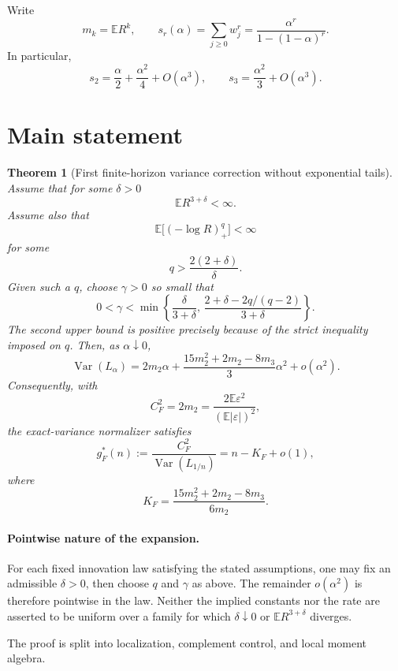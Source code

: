 \documentclass[11pt,a4paper]{article}
\newtheorem{theorem}{Theorem}
\newcommand{\E}{\mathbb E}
\newcommand{\Var}{\operatorname{Var}}
\begin{document}
Write
\[
m_k=\E R^k,
\qquad
s_r(\alpha)=\sum_{j\ge0}w_j^r
=\frac{\alpha^r}{1-(1-\alpha)^r}.
\]
In particular,
\[
s_2=\frac\alpha2+\frac{\alpha^2}{4}+O(\alpha^3),
\qquad
s_3=\frac{\alpha^2}{3}+O(\alpha^3).
\]

\section{Main statement}
\begin{theorem}[First finite-horizon variance correction without exponential tails]
Assume that for some $\delta>0$
\[
\E R^{3+\delta}<\infty.
\]
Assume also that
\[
\E\bigl[(-\log R)_+^q\bigr]<\infty
\]
for some
\[
q>\frac{2(2+\delta)}{\delta}.
\]
Given such a $q$, choose $\gamma>0$ so small that
\begin{equation}\label{eq:gamma-choice}
0<\gamma<\min\left\{
\frac{\delta}{3+\delta},\,
\frac{2+\delta-2q/(q-2)}{3+\delta}
\right\}.
\end{equation}
The second upper bound is positive precisely because of the strict inequality imposed on $q$.  Then, as $\alpha\downarrow0$,
\begin{equation}\label{eq:var-exp}
\boxed{
\Var(L_\alpha)
=2m_2\alpha
+\frac{15m_2^2+2m_2-8m_3}{3}\alpha^2
+o(\alpha^2).}
\end{equation}
Consequently, with
\[
C_F^2=2m_2=\frac{2\E\varepsilon^2}{(\E|\varepsilon|)^2},
\]
the exact-variance normalizer satisfies
\begin{equation}\label{eq:g-shift}
\boxed{
 g_F^*(n):=\frac{C_F^2}{\Var(L_{1/n})}
=n-K_F+o(1),}
\end{equation}
where
\begin{equation}\label{eq:K}
\boxed{
K_F=\frac{15m_2^2+2m_2-8m_3}{6m_2}.}
\end{equation}
\end{theorem}

\paragraph{Pointwise nature of the expansion.}
For each fixed innovation law satisfying the stated assumptions, one may fix an admissible $\delta>0$, then choose $q$ and $\gamma$ as above.  The remainder $o(\alpha^2)$ is therefore pointwise in the law.  Neither the implied constants nor the rate are asserted to be uniform over a family for which $\delta\downarrow0$ or $\E R^{3+\delta}$ diverges.

The proof is split into localization, complement control, and local moment algebra.
\end{document}
